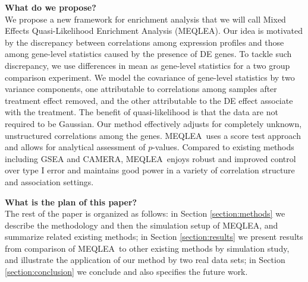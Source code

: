 \documentclass[useAMS,usenatbib, galley]{biom}
\newcommand{\OurMethod}{MEQLEA}
\begin{document}
	
	
	\textbf{What do we propose?} \\
	We propose a new framework for enrichment analysis that we will call Mixed Effects Quasi-Likelihood Enrichment Analysis (\OurMethod). Our idea is motivated by the discrepancy between correlations among expression profiles and those among gene-level statistics caused by the presence of DE genes. To tackle such discrepancy, we use differences in mean as gene-level statistics for a two group comparison experiment. We model the covariance of gene-level statistics by two variance components, one attributable to correlations among samples after treatment effect removed, and the other attributable to the DE effect associate with the treatment. The benefit of quasi-likelihood is that the data are not required to be Gaussian. Our method effectively adjusts for completely unknown, unstructured correlations among the genes. \OurMethod~uses a score test approach and allows for analytical assessment of $p$-values. Compared to existing methods including GSEA and CAMERA, \OurMethod~enjoys robust and improved control over type I error and maintains good power in a variety of correlation structure and association settings. 
	
	\textbf{What is the plan of this paper?} \\
	The rest of the paper is organized as follows: in Section \ref{section:methods} we describe the methodology and then the simulation setup of \OurMethod, and summarize related existing methods; in Section \ref{section:results} we present results from comparison of \OurMethod~to other existing methods by simulation study, and illustrate the application of our method by two real data sets; in Section \ref{section:conclusion} we conclude and also specifies the future work.

	
	
\end{document}
